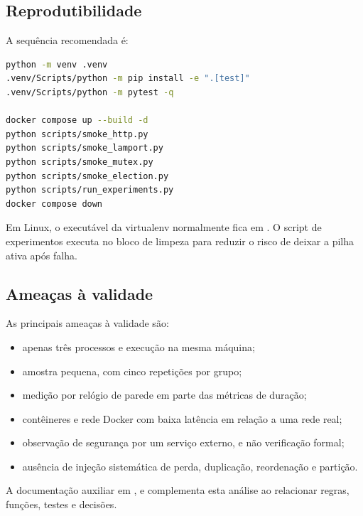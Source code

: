\subsection{Reprodutibilidade}

A sequência recomendada é:

\begin{lstlisting}[language=bash,caption={Comandos de validação e reprodução.}]
python -m venv .venv
.venv/Scripts/python -m pip install -e ".[test]"
.venv/Scripts/python -m pytest -q

docker compose up --build -d
python scripts/smoke_http.py
python scripts/smoke_lamport.py
python scripts/smoke_mutex.py
python scripts/smoke_election.py
python scripts/run_experiments.py
docker compose down
\end{lstlisting}

Em Linux, o executável da virtualenv normalmente fica em . O script de experimentos executa  no bloco de limpeza para reduzir o risco de deixar a pilha ativa após falha.

\subsection{Ameaças à validade}

As principais ameaças à validade são:

\begin{itemize}
    \item apenas três processos e execução na mesma máquina;
    \item amostra pequena, com cinco repetições por grupo;
    \item medição por relógio de parede em parte das métricas de duração;
    \item contêineres e rede Docker com baixa latência em relação a uma rede real;
    \item observação de segurança por um serviço externo, e não verificação formal;
    \item ausência de injeção sistemática de perda, duplicação, reordenação e partição.
\end{itemize}

A documentação auxiliar em ,  e  complementa esta análise ao relacionar regras, funções, testes e decisões.
